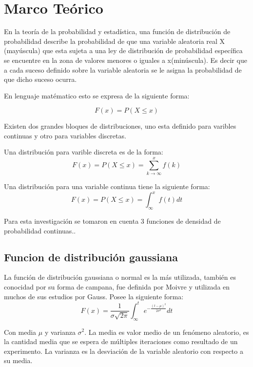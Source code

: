 \documentclass[letterpaper]{article}
\begin{document}
\newpage

\section{Marco Teórico}
 En la teoría de la probabilidad y estadística, una función de distribución de probabilidad describe la probabilidad de que una variable aleatoria real X (mayúscula) que esta sujeta a una ley de distribución de probabilidad específica se encuentre en la zona de valores menores o iguales a x(minúscula).
 Es decir que a cada suceso definido sobre la variable aleatoria se le asigna la probabilidad de que dicho suceso ocurra. 

 En lenguaje matématico esto se expresa de la siguiente forma:

\begin{equation}
 F(x) = P(X \leq x)
\end{equation}

 Existen dos grandes bloques de distribuciones, uno esta definido para varibles continuas y otro para variables discretas.

Una distribución para varible discreta es de la forma:
\begin{equation}
 F(x) = P(X \leq x) = \sum_{k \to \infty}^x f(k)
\end{equation}

Una distribución para una variable continua tiene la siguiente forma:
\begin{equation}
 F(x) = P(X \leq x) = \int_\infty^x \!f(t)dt
\end{equation}


Para esta investigación se tomaron en cuenta 3 funciones de densidad de probabilidad continuas.\cite{Peyton}.

\subsection{Funcion de distribución gaussiana}
La función de distribución gaussiana o normal es la más utilizada, también es conocidad por su forma de campana, fue definida por Moivre y utilizada en muchos de sus estudios por Gauss. Posee la siguiente forma:
\begin{equation}
F(x) = \frac{1}{\sigma\sqrt{2\pi}}\int_\infty^t \!e^{-\frac{(t-\mu)^2}{2\sigma^2}} dt
\end{equation}

Con media $\mu$ y varianza $\sigma^2$. La media es valor medio de un fenómeno aleatorio, es la cantidad media que se espera de múltiples iteraciones como resultado de un experimento. La varianza es la desviación de la variable aleatorio con respecto a su media.\cite{Peyton}
\end{document}
